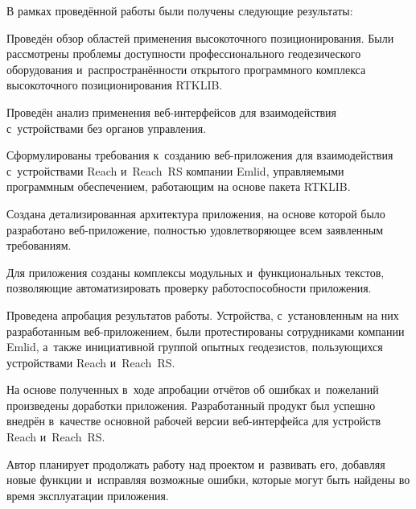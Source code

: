
В рамках проведённой работы были получены следующие результаты:
\begin{dashitemize}
  \item Проведён обзор областей применения высокоточного позиционирования. Были рассмотрены проблемы доступности профессионального геодезического оборудования и~распространённости открытого программного комплекса высокоточного позиционирования RTKLIB.
  \item Проведён анализ применения веб-интерфейсов для взаимодействия с~устройствами без органов управления.
  \item Сформулированы требования к~созданию веб-приложения для взаимодействия с~устройствами Reach и~Reach~RS компании Emlid, управляемыми программным обеспечением, работающим на основе пакета RTKLIB.
  \item Создана детализированная архитектура приложения, на основе которой было разработано веб-приложение, полностью удовлетворяющее всем заявленным требованиям.
  \item Для приложения созданы комплексы модульных и~функциональных текстов, позволяющие автоматизировать проверку работоспособности приложения.
  \item Проведена апробация результатов работы. Устройства, с~установленным на них разработанным веб-приложением, были протестированы сотрудниками компании Emlid, а~также инициативной группой опытных геодезистов, пользующихся устройствами Reach и~Reach~RS.
  \item На основе полученных в~ходе апробации отчётов об ошибках и~пожеланий произведены доработки приложения. Разработанный продукт был успешно внедрён в~качестве основной рабочей версии веб-интерфейса для устройств Reach и~Reach~RS.
\end{dashitemize}

\newpage

Автор планирует продолжать работу над проектом и~развивать его, добавляя новые функции и~исправляя возможные ошибки, которые могут быть найдены во время эксплуатации приложения.

\newpage
